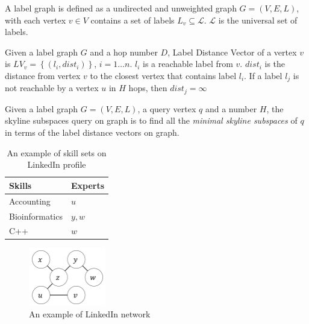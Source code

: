 \begin{definition}
A label graph is defined as a undirected and unweighted graph $G = (V, E, L)$, with each vertex $v \in V$ contains a set of labels $L_v \subseteq \mathcal{L}$. $\mathcal{L}$ is the universal set of labels.
\end{definition}

\begin{definition}
Given a label graph $G$ and a hop number $D$, Label Distance Vector of a vertex $v$ is $LV_v=\left\{\left(l_i, dist_i\right)\right\}$, $i = 1 \ldots n$. $l_i$ is a reachable label from $v$. $dist_i$ is the distance from vertex $v$ to the closest vertex that contains label $l_i$. If a label $l_j$ is not reachable by a vertex $u$ in $H$ hops, then $dist_j = \infty$
\end{definition}

\begin{definition}
Given a label graph $G = (V, E, L)$, a query vertex $q$ and a number $H$, the skyline subspaces query on graph is to find all the \emph{minimal skyline subspaces} of $q$ in terms of the label distance vectors on graph.
\end{definition}

\begin{table}[h]
    \centering
    \begin{tabular}{|l|l|}
    \hline
    Skills         & Experts \\ \hline
    Accounting     & $u$     \\ \hline
    Bioinformatics & $y, w$  \\ \hline
    C++            & $w$     \\ \hline
    \end{tabular}
    \caption{\label{tab:skill_sets}An example of skill sets on LinkedIn profile}
\end{table}
    
\begin{figure}[h]
    \centering
    \includegraphics[width=0.3\textwidth]{figs/graph_example}
    \caption{\label{fig:graph}An example of LinkedIn network}
    
\end{figure}

